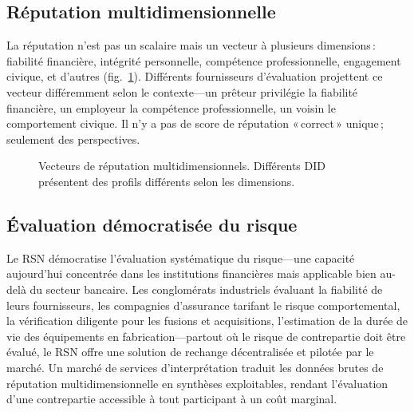 \documentclass[11pt,a4paper,twocolumn]{article}
\begin{document}
\subsection{Réputation multidimensionnelle}

La réputation n'est pas un scalaire mais un vecteur à plusieurs dimensions\,: fiabilité financière, intégrité personnelle, compétence professionnelle, engagement civique, et d'autres (fig.~\ref{fig:reputation-radar}). Différents fournisseurs d'évaluation projettent ce vecteur différemment selon le contexte---un prêteur privilégie la fiabilité financière, un employeur la compétence professionnelle, un voisin le comportement civique. Il n'y a pas de score de réputation «\,correct\,» unique\,; seulement des perspectives.

\begin{figure}[ht]
\centering
{}
\caption{Vecteurs de réputation multidimensionnels. Différents DID présentent des profils différents selon les dimensions.}
\label{fig:reputation-radar}
\end{figure}

\subsection{Évaluation démocratisée du risque}

Le RSN démocratise l'évaluation systématique du risque---une capacité aujourd'hui concentrée dans les institutions financières mais applicable bien au-delà du secteur bancaire. Les conglomérats industriels évaluant la fiabilité de leurs fournisseurs, les compagnies d'assurance tarifant le risque comportemental, la vérification diligente pour les fusions et acquisitions, l'estimation de la durée de vie des équipements en fabrication---partout où le risque de contrepartie doit être évalué, le RSN offre une solution de rechange décentralisée et pilotée par le marché. Un marché de services d'interprétation traduit les données brutes de réputation multidimensionnelle en synthèses exploitables, rendant l'évaluation d'une contrepartie accessible à tout participant à un coût marginal.
\end{document}
